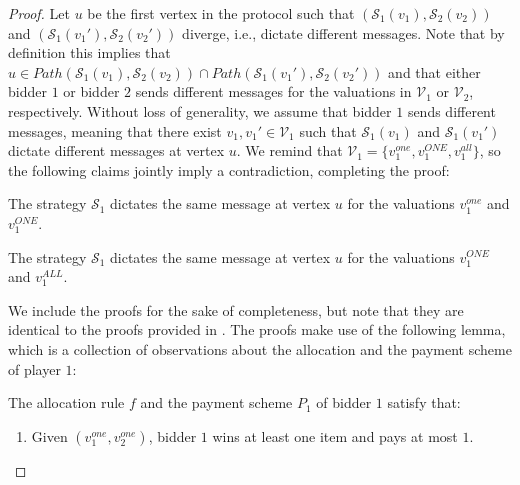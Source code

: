 \begin{proof}
 Let $u$ be the first vertex in the protocol such that 
 $(\mathcal{S}_1(v_1),\mathcal{S}_2(v_2))$ and $(\mathcal{S}_1(v_1'),\mathcal{S}_2(v_2'))$ diverge, i.e., dictate different messages. 
Note that by definition this implies that $u\in Path(\mathcal{S}_1(v_1),\mathcal{S}_2(v_2))\cap Path(\mathcal{S}_1(v_1'),\mathcal{S}_2(v_2'))$ and that either bidder $1$ or bidder $2$ sends different messages for the valuations in $\mathcal{V}_1$ or $\mathcal V_2$, respectively. 
Without loss of generality, we assume that bidder $1$ sends different messages, meaning that there exist $v_1,v_1'\in \mathcal{V}_1$ such that $\mathcal S_1(v_1)$ and $\mathcal S_1(v_1')$ dictate different messages at vertex $u$.  
We remind that $\mathcal{V}_1=\{v_1^{one},v_1^{ONE},v_1^{all}\}$, so the  following claims jointly imply a contradiction, completing the proof: 
\begin{claim}\label{claim-oneone-same}
    The strategy $\mathcal S_1$ dictates the same message at vertex $u$ for the valuations $v_1^{one}$ and $v_1^{ONE}$. 
\end{claim}
\begin{claim}\label{claim-ONE-ALL-same}
        The strategy $\mathcal S_1$ dictates the same message at vertex $u$ for the valuations $v_1^{ONE}$ and $v_1^{ALL}$.
\end{claim}
We include the proofs for the sake of completeness, {but note that} they are identical to the proofs provided in \cite{Ron24}.
The proofs make use of the following lemma, which is a collection of observations about the allocation and the payment scheme of player $1$:    
\begin{lemma}\label{lemma-small-pay}
    The allocation rule $f$ and the payment scheme $P_1$ of bidder $1$ satisfy that:
    \begin{enumerate}
        \item Given $(v_1^{one},v_{2}^{one})$, bidder $1$ wins at least one item and pays at most $1$.  \label{item-1}

\end{enumerate}
\end{lemma}
\end{proof}
